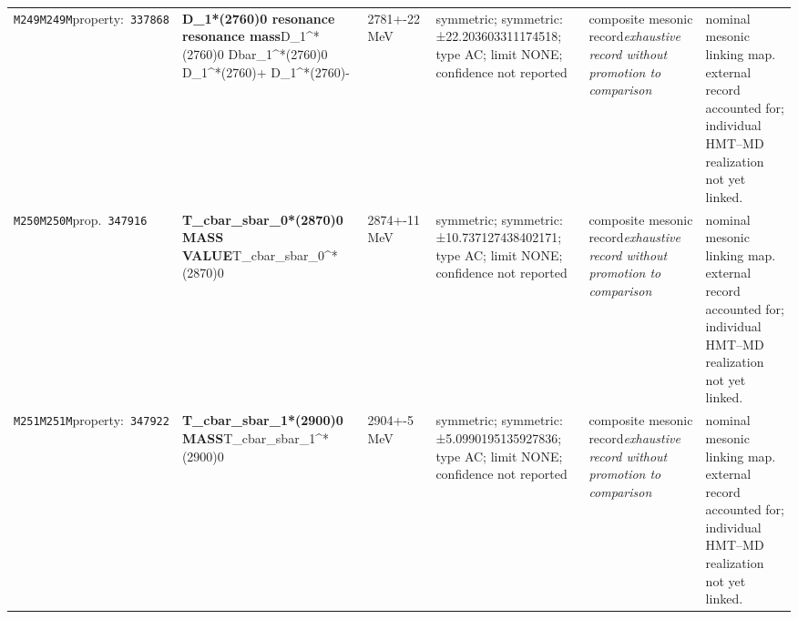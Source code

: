\begin{landscape}
\begin{longtable}{L{1.85cm}L{4.45cm}L{2.35cm}L{4.05cm}L{3.35cm}L{7.15cm}}
\texttt{M249}\newline \texttt{M249M}\newline property:\ \texttt{337868} & \textbf{D\_\allowbreak{}1*(2760)0 resonance resonance mass}\newline D\_\allowbreak{}1\textasciicircum{}*(2760)0 \textbar{}\allowbreak{} Dbar\_\allowbreak{}1\textasciicircum{}*(2760)0 \textbar{}\allowbreak{} D\_\allowbreak{}1\textasciicircum{}*(2760)+ \textbar{}\allowbreak{} D\_\allowbreak{}1\textasciicircum{}*(2760)- & 2781+-22\,MeV & symmetric; symmetric: ±22.203603311174518; type AC; limit NONE; confidence not reported & composite mesonic record\newline \emph{exhaustive record without promotion to comparison} & nominal mesonic linking map. external record accounted for; individual HMT--MD realization not yet linked. \\
\texttt{M250}\newline \texttt{M250M}\newline prop.\ \texttt{347916} & \textbf{T\_\allowbreak{}cbar\_\allowbreak{}sbar\_\allowbreak{}0*(2870)0 MASS VALUE}\newline T\_\allowbreak{}cbar\_\allowbreak{}sbar\_\allowbreak{}0\textasciicircum{}*(2870)0 & 2874+-11\,MeV & symmetric; symmetric: ±10.737127438402171; type AC; limit NONE; confidence not reported & composite mesonic record\newline \emph{exhaustive record without promotion to comparison} & nominal mesonic linking map. external record accounted for; individual HMT--MD realization not yet linked. \\
\texttt{M251}\newline \texttt{M251M}\newline property:\ \texttt{347922} & \textbf{T\_\allowbreak{}cbar\_\allowbreak{}sbar\_\allowbreak{}1*(2900)0 MASS}\newline T\_\allowbreak{}cbar\_\allowbreak{}sbar\_\allowbreak{}1\textasciicircum{}*(2900)0 & 2904+-5\,MeV & symmetric; symmetric: ±5.0990195135927836; type AC; limit NONE; confidence not reported & composite mesonic record\newline \emph{exhaustive record without promotion to comparison} & nominal mesonic linking map. external record accounted for; individual HMT--MD realization not yet linked. \\

\end{longtable}
\end{landscape}
